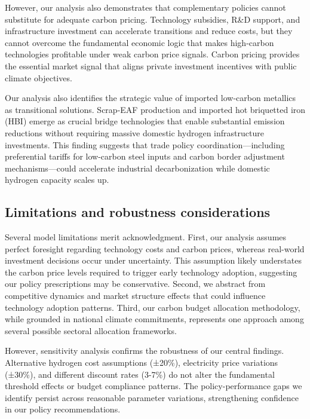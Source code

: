 \documentclass[preprint,5p,authoryear]{elsarticle}
\begin{document}
However, our analysis also demonstrates that complementary policies cannot substitute for adequate carbon pricing. Technology subsidies, R\&D support, and infrastructure investment can accelerate transitions and reduce costs, but they cannot overcome the fundamental economic logic that makes high-carbon technologies profitable under weak carbon price signals. Carbon pricing provides the essential market signal that aligns private investment incentives with public climate objectives.

Our analysis also identifies the strategic value of imported low-carbon metallics as transitional solutions. Scrap-EAF production and imported hot briquetted iron (HBI) emerge as crucial bridge technologies that enable substantial emission reductions without requiring massive domestic hydrogen infrastructure investments. This finding suggests that trade policy coordination—including preferential tariffs for low-carbon steel inputs and carbon border adjustment mechanisms—could accelerate industrial decarbonization while domestic hydrogen capacity scales up.

\subsection{Limitations and robustness considerations}

Several model limitations merit acknowledgment. First, our analysis assumes perfect foresight regarding technology costs and carbon prices, whereas real-world investment decisions occur under uncertainty. This assumption likely understates the carbon price levels required to trigger early technology adoption, suggesting our policy prescriptions may be conservative. Second, we abstract from competitive dynamics and market structure effects that could influence technology adoption patterns. Third, our carbon budget allocation methodology, while grounded in national climate commitments, represents one approach among several possible sectoral allocation frameworks.

However, sensitivity analysis confirms the robustness of our central findings. Alternative hydrogen cost assumptions (±20\%), electricity price variations (±30\%), and different discount rates (3-7\%) do not alter the fundamental threshold effects or budget compliance patterns. The policy-performance gaps we identify persist across reasonable parameter variations, strengthening confidence in our policy recommendations.
\end{document}
